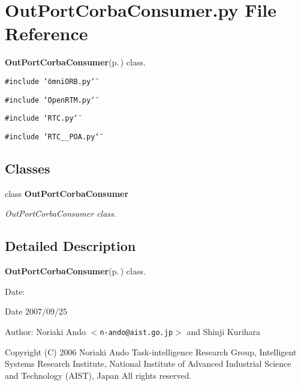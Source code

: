 \section{Out\-Port\-Corba\-Consumer.py File Reference}
\label{OutPortCorbaConsumer_8py}
{\bf Out\-Port\-Corba\-Consumer}{\rm (p.\,\pageref{classOutPortCorbaConsumer})} class. 

{\tt \#include \char`\"{}omni\-ORB.py\char`\"{}}\par
{\tt \#include \char`\"{}Open\-RTM.py\char`\"{}}\par
{\tt \#include \char`\"{}RTC.py\char`\"{}}\par
{\tt \#include \char`\"{}RTC\_\-\_\-POA.py\char`\"{}}\par
\subsection*{Classes}
\begin{CompactItemize}
\item 
class {\bf Out\-Port\-Corba\-Consumer}
\begin{CompactList}\small\item\em Out\-Port\-Corba\-Consumer class. \item\end{CompactList}\end{CompactItemize}


\subsection{Detailed Description}
{\bf Out\-Port\-Corba\-Consumer}{\rm (p.\,\pageref{classOutPortCorbaConsumer})} class. 

\begin{Desc}
\item[Date:]\begin{Desc}
\item[Date]2007/09/25 \end{Desc}
\end{Desc}
\begin{Desc}
\item[Author:]Noriaki Ando $<${\tt n-ando@aist.go.jp}$>$ and Shinji Kurihara\end{Desc}
Copyright (C) 2006 Noriaki Ando Task-intelligence Research Group, Intelligent Systems Research Institute, National Institute of Advanced Industrial Science and Technology (AIST), Japan All rights reserved.